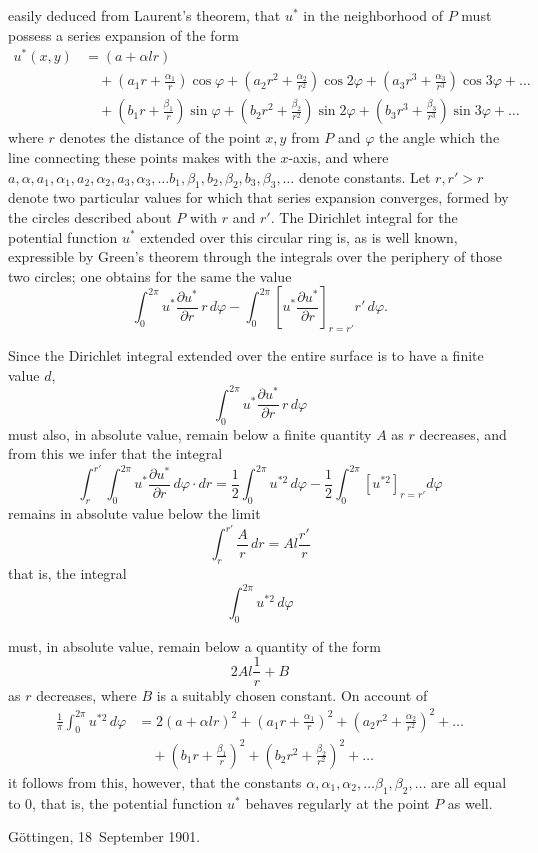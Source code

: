 \documentclass{article}
\begin{document}
easily deduced from Laurent's theorem, that $u^*$ in the neighborhood of $P$ must possess a series expansion of the form
\[
\begin{aligned}
u^*(x, y) &= (a + \alpha l r) \\
&\quad + \left(a_1 r + \frac{\alpha_1}{r}\right) \cos \varphi + \left(a_2 r^2 + \frac{\alpha_2}{r^2}\right) \cos 2\varphi + \left(a_3 r^3 + \frac{\alpha_3}{r^3}\right) \cos 3\varphi + \dots \\
&\quad + \left(b_1 r + \frac{\beta_1}{r}\right) \sin \varphi + \left(b_2 r^2 + \frac{\beta_2}{r^2}\right) \sin 2\varphi + \left(b_3 r^3 + \frac{\beta_3}{r^3}\right) \sin 3\varphi + \dots
\end{aligned}
\]
where $r$ denotes the distance of the point $x, y$ from $P$ and $\varphi$ the angle which the line connecting these points makes with the $x$-axis, and where $a, \alpha, a_1, \alpha_1, a_2, \alpha_2, a_3, \alpha_3, \dots b_1, \beta_1, b_2, \beta_2, b_3, \beta_3, \dots$ denote constants. Let $r, r'>r$ denote two particular values for which that series expansion converges, formed by the circles described about $P$ with $r$ and $r'$. The Dirichlet integral for the potential function $u^*$ extended over this circular ring is, as is well known, expressible by Green's theorem through the integrals over the periphery of those two circles; one obtains for the same the value
\[
\int_0^{2\pi} u^* \frac{\partial u^*}{\partial r}\,r\,d\varphi - \int_0^{2\pi} \left[ u^* \frac{\partial u^*}{\partial r} \right]_{r=r'} r'\,d\varphi.
\]

Since the Dirichlet integral extended over the entire surface is to have a finite value $d$,
\[
\int_0^{2\pi} u^* \frac{\partial u^*}{\partial r}\,r\,d\varphi
\]
must also, in absolute value, remain below a finite quantity $A$ as $r$ decreases, and from this we infer that the integral
\[
\int_r^{r'} \int_0^{2\pi} u^* \frac{\partial u^*}{\partial r}\,d\varphi \cdot dr = \frac{1}{2} \int_0^{2\pi} u^{*2}\,d\varphi - \frac{1}{2} \int_0^{2\pi} \left[ u^{*2} \right]_{r=r'} d\varphi
\]
remains in absolute value below the limit
\[
\int_r^{r'} \frac{A}{r}\,dr = A l \frac{r'}{r}
\]
that is, the integral
\[
\int_0^{2\pi} u^{*2}\,d\varphi
\]

must, in absolute value, remain below a quantity of the form
\[
2 A l \frac{1}{r} + B
\]
as $r$ decreases, where $B$ is a suitably chosen constant. On account of
\[
\begin{aligned}
\frac{1}{\pi} \int_0^{2\pi} u^{*2}\,d\varphi &= 2(a + \alpha l r)^2 + \left(a_1 r + \frac{\alpha_1}{r}\right)^2 + \left(a_2 r^2 + \frac{\alpha_2}{r^2}\right)^2 + \dots \\
&\quad + \left(b_1 r + \frac{\beta_1}{r}\right)^2 + \left(b_2 r^2 + \frac{\beta_2}{r^2}\right)^2 + \dots
\end{aligned}
\]
it follows from this, however, that the constants $\alpha, \alpha_1, \alpha_2, \dots \beta_1, \beta_2, \dots$ are all equal to 0, that is, the potential function $u^*$ behaves regularly at the point $P$ as well.

Göttingen, 18~September 1901.
\end{document}
